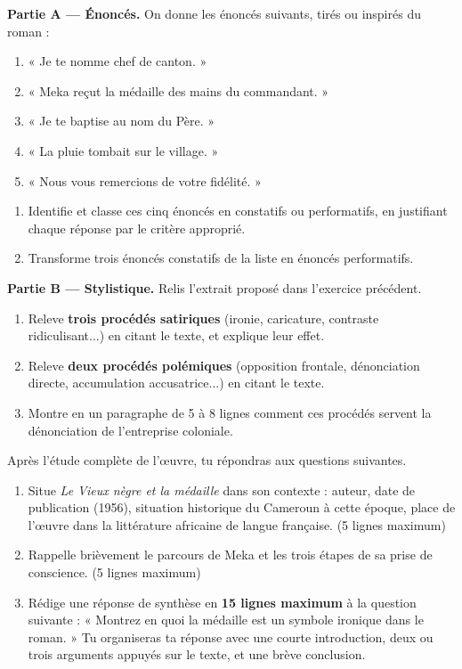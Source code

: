 \documentclass[11pt]{article}
\begin{document}
\begin{exercice}
\textbf{Partie A — Énoncés.} On donne les énoncés suivants, tirés ou inspirés du roman :
\begin{enumerate}
\item « Je te nomme chef de canton. »
\item « Meka reçut la médaille des mains du commandant. »
\item « Je te baptise au nom du Père. »
\item « La pluie tombait sur le village. »
\item « Nous vous remercions de votre fidélité. »
\end{enumerate}
\begin{enumerate}
\item Identifie et classe ces cinq énoncés en constatifs ou performatifs, en justifiant chaque réponse par le critère approprié.
\item Transforme trois énoncés constatifs de la liste en énoncés performatifs.
\end{enumerate}
\textbf{Partie B — Stylistique.} Relis l'extrait proposé dans l'exercice précédent.
\begin{enumerate}
\item Releve \textbf{trois procédés satiriques} (ironie, caricature, contraste ridiculisant...) en citant le texte, et explique leur effet.
\item Releve \textbf{deux procédés polémiques} (opposition frontale, dénonciation directe, accumulation accusatrice...) en citant le texte.
\item Montre en un paragraphe de 5 à 8 lignes comment ces procédés servent la dénonciation de l'entreprise coloniale.
\end{enumerate}
\end{exercice}

\begin{exercice}
Après l'étude complète de l'œuvre, tu répondras aux questions suivantes.
\begin{enumerate}
\item Situe \emph{Le Vieux nègre et la médaille} dans son contexte : auteur, date de publication (1956), situation historique du Cameroun à cette époque, place de l'œuvre dans la littérature africaine de langue française. (5 lignes maximum)
\item Rappelle brièvement le parcours de Meka et les trois étapes de sa prise de conscience. (5 lignes maximum)
\item Rédige une réponse de synthèse en \textbf{15 lignes maximum} à la question suivante : « Montrez en quoi la médaille est un symbole ironique dans le roman. » Tu organiseras ta réponse avec une courte introduction, deux ou trois arguments appuyés sur le texte, et une brève conclusion.
\end{enumerate}
\end{exercice}
\end{document}
